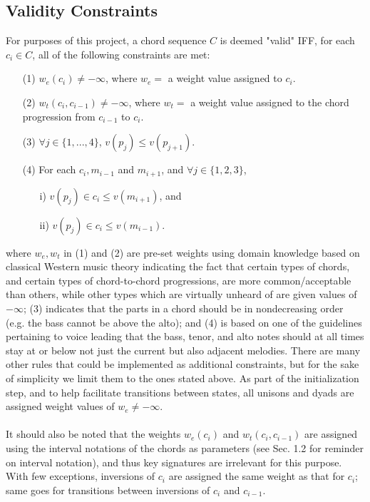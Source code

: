 \documentclass[twoside]{article}
\begin{document}
	\subsection{Validity Constraints}
	For purposes of this project, a chord sequence $C$ is deemed "valid" IFF, for each $c_i \in C$, all of the following constraints are met:
	\begin{enumerate}
		\item[(1)]
		$w_e(c_i) \neq -\infty$, where $w_e=$ a weight value assigned to $c_i$.
		\item[(2)]
		$w_t(c_i, c_{i-1}) \neq -\infty$, where $w_t=$ a weight value assigned to the chord progression from $c_{i-1}$ to $c_i$.
		\item[(3)]
		$\forall j \in \{1,...,4\}$, $v(p_j) \leq v(p_{j+1})$.
		\item[(4)]
		For each $c_i, m_{i-1}$ and $m_{i+1}$, and $\forall j \in \{1, 2, 3\}$, 
		\begin{enumerate}
			\item[i)]
			$v(p_j) \in c_i \leq v(m_{i+1})$, and
			\item[ii)]
			$v(p_j) \in c_i \leq v(m_{i-1})$.
		\end{enumerate} 
	\end{enumerate} 
	where $w_e, w_t$ in (1) and (2) are pre-set weights using domain knowledge based on classical Western music theory indicating the fact that certain types of chords, and certain types of chord-to-chord progressions, are more common/acceptable than others, while other types which are virtually unheard of are given values of $-\infty$; (3) indicates that the parts in a chord should be in nondecreasing order (e.g. the bass cannot be above the alto); and (4) is based on one of the guidelines pertaining to voice leading that the bass, tenor, and alto notes should at all times stay at or below not just the current but also adjacent melodies. There are many other rules that could be implemented as additional constraints, but for the sake of simplicity we limit them to the ones stated above. As part of the initialization step, and to help facilitate transitions between states, all unisons and dyads are assigned weight values of $w_e \neq -\infty$.
	\\\\
	It should also be noted that the weights $w_e(c_i)$ and $w_t(c_i, c_{i-1})$ are assigned using the interval notations of the chords as parameters (see Sec. 1.2 for reminder on interval notation), and thus key signatures are irrelevant for this purpose. With few exceptions, inversions of $c_i$ are assigned the same weight as that for $c_i$; same goes for transitions between inversions of $c_i$ and $c_{i-1}$.
\end{document}
